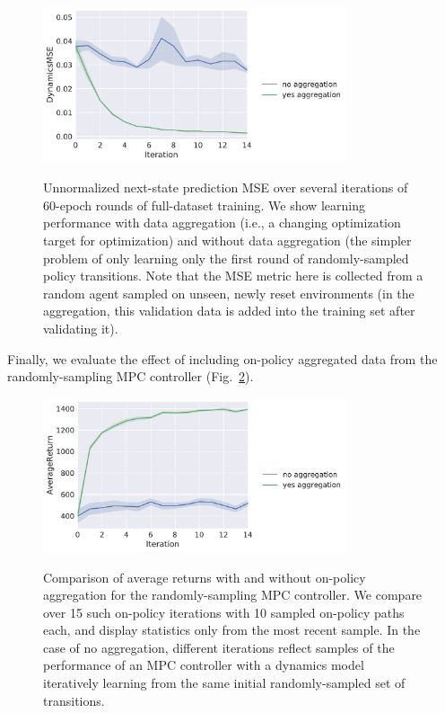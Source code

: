 \documentclass{article}
\begin{document}
\begin{figure}[!h]
  \begin{center}
    {\includegraphics[width=0.8\textwidth]{DynamicsMSE.pdf}}
  \end{center}
  \caption{Unnormalized next-state prediction MSE over several iterations of 60-epoch rounds of full-dataset training. We show learning performance with data aggregation (i.e., a changing optimization target for optimization) and without data aggregation (the simpler problem of only learning only the first round of randomly-sampled policy transitions. Note that the MSE metric here is collected from a random agent sampled on unseen, newly reset environments (in the aggregation, this validation data is added into the training set after validating it).}
\label{fig:learn-dyn}
\end{figure}

\FloatBarrier

Finally, we evaluate the effect of including on-policy aggregated data from the randomly-sampling MPC controller (Fig.~\ref{fig:agg-returns}).

\begin{figure}[!h]
  \begin{center}
    {\includegraphics[width=0.8\textwidth]{AverageReturn.pdf}}
  \end{center}
  \caption{Comparison of average returns with and without on-policy aggregation for the randomly-sampling MPC controller. We compare over 15 such on-policy iterations with 10 sampled on-policy paths each, and display statistics only from the most recent sample. In the case of no aggregation, different iterations reflect samples of the performance of an MPC controller with a dynamics model iteratively learning from the same initial randomly-sampled set of transitions.}
\label{fig:agg-returns}
\end{figure}
\end{document}
